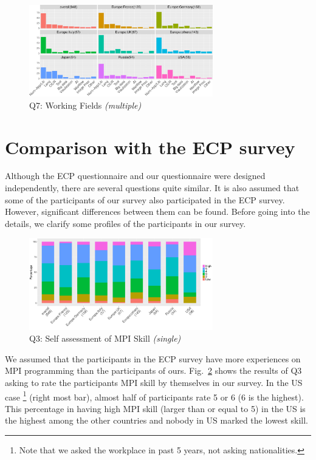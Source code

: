 \documentclass[conference,10pt,letterpaper]{IEEEtran}
\begin{document}
\begin{figure}[htb]
  \begin{center}
    \includegraphics[width=8cm]{R-scripts/Q7.pdf}
    \caption{Q7: Working Fields {\it(multiple)}}
    \label{fig:working-fields}
  \end{center}
\end{figure}

\section{Comparison with the ECP survey}

Although the ECP questionnaire and our questionnaire were designed
independently, there are several questions quite similar. It is also
assumed that some of the participants of our survey 
also participated in the ECP survey. However, significant differences
between them can be found. Before going into the details, we clarify
some profiles of the participants in our survey.

\begin{figure}[htb]
  \begin{center}
    \includegraphics[width=8cm]{R-scripts/Q3.pdf}
    \caption{Q3: Self assessment of MPI Skill {\it(single)}}
    \label{fig:mpi-skill}
  \end{center}
\end{figure}

We assumed that the participants in the ECP survey have more
experiences on MPI
programming than the participants of ours. Fig.~\ref{fig:mpi-skill} 
shows the results of Q3 asking to rate the participants MPI skill by
themselves in our survey.  In the US case 
\footnote{Note that we asked
  the workplace in past 5 years, not asking nationalities.}
(right most bar), almost half of participants rate 5 or 6
(6 is the highest). This percentage in having high MPI skill (larger
than or equal to 5) in the US is the highest among the other
countries and nobody in US marked the lowest skill.
\end{document}
